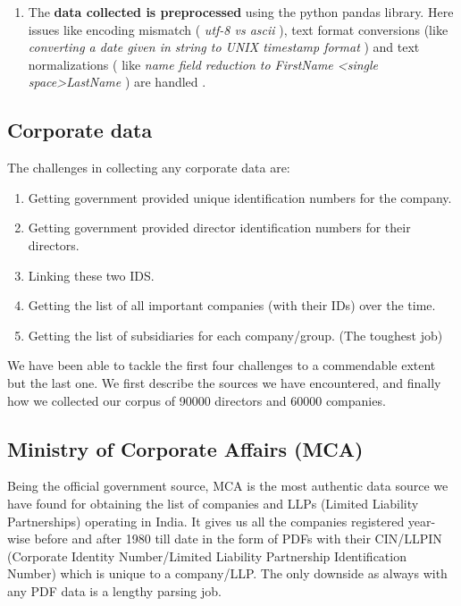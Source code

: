\begin{enumerate}
    \item The \textbf{data collected is preprocessed} using the python pandas library. Here issues like encoding mismatch (\emph{ utf-8 vs ascii }), text format conversions (like \emph{ converting a date given in string to UNIX timestamp format }) and text normalizations ( like \emph{ name field reduction to FirstName  \textless single space\textgreater   LastName }) are handled .

\end{enumerate}


\subsection{Corporate data}

The challenges in collecting any corporate data are:

\begin{enumerate}
    \item Getting government provided unique identification numbers for the company.
    \item Getting government provided director identification numbers for their directors.
    \item Linking these two IDS.
    \item Getting the list of all important companies (with their IDs) over the time.
    \item Getting the list of subsidiaries for each company/group. (The toughest job)
\end{enumerate}  

We have been able to tackle the first four challenges to a commendable extent but the last one.  We first describe the sources we have encountered, and finally how we collected our corpus of 90000 directors and 60000 companies.



\subsection{Ministry of Corporate Affairs (MCA)} 

Being the official government source, MCA \cite{MCA} is the most authentic data source we have found for obtaining the list of companies and LLPs (Limited Liability Partnerships) operating in India. It gives us all the companies registered year-wise before and after 1980 till date in the form of PDFs with their CIN/LLPIN (Corporate Identity Number/Limited Liability Partnership Identification Number) which is unique to a company/LLP. The only downside as always with any PDF data is a lengthy parsing job.

